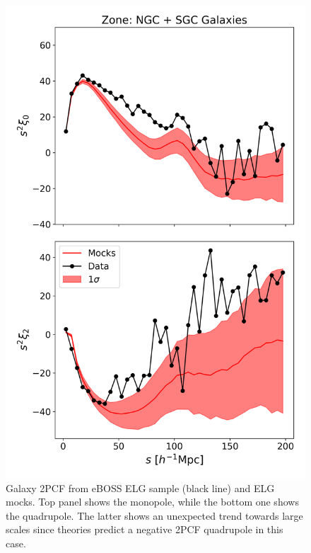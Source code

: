 \documentclass[fleqn, usenatbib]{mnras}
\begin{document}
\begin{figure}
	\centering
	\includegraphics[width=1\linewidth]{plots/gal_CBZ}
	\caption{Galaxy 2PCF from eBOSS ELG sample (black line) and ELG mocks. Top panel shows the monopole, while the bottom one shows the quadrupole. The latter shows an unexpected trend towards large scales since theories predict a negative 2PCF quadrupole in this case.}
	\label{fig:galcbz}
\end{figure}
\end{document}

